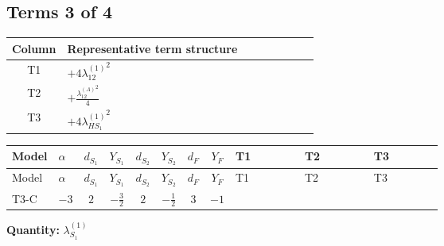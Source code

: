 \documentclass[8pt]{article}
\begin{document}
\begin{landscape}
\subsection*{Terms 3 of 4}
\begin{center}
\begin{tabular}{@{}c >{\raggedright\arraybackslash}p{0.82\linewidth}@{}}
\toprule
Column & Representative term structure \\
\midrule
T1 & \(\displaystyle +4 {\lambda_{12}^{(1)}}^2\) \\
\midrule
T2 & \(\displaystyle +\frac{{\lambda_{12}^{(A)}}^2}{4}\) \\
\midrule
T3 & \(\displaystyle +4 {\lambda_{HS_1}^{(1)}}^2\) \\
\midrule
\bottomrule
\end{tabular}
\end{center}
\smallskip
\tiny
\begin{longtable}{@{}llcccccc >{\raggedright\arraybackslash}p{0.21\linewidth} >{\raggedright\arraybackslash}p{0.21\linewidth} >{\raggedright\arraybackslash}p{0.21\linewidth}@{}}
\toprule
Model & $\alpha$ & $d_{S_1}$ & $Y_{S_1}$ & $d_{S_2}$ & $Y_{S_2}$ & $d_F$ & $Y_F$ & T1 & T2 & T3 \\
\midrule
\endfirsthead
\toprule
Model & $\alpha$ & $d_{S_1}$ & $Y_{S_1}$ & $d_{S_2}$ & $Y_{S_2}$ & $d_F$ & $Y_F$ & T1 & T2 & T3 \\
\midrule
\endhead
T3-C & $-3$ & $2$ & $-\frac{3}{2}$ & $2$ & $-\frac{1}{2}$ & $3$ & $-1$ & \scriptsize\adjustbox{max width=\linewidth}{$\begin{gathered} +4 {\lambda_{12}^{(1)}}^2\end{gathered}$} & \scriptsize\adjustbox{max width=\linewidth}{$\begin{gathered} +\frac{{\lambda_{12}^{(A)}}^2}{4}\end{gathered}$} & \scriptsize\adjustbox{max width=\linewidth}{$\begin{gathered} +4 {\lambda_{HS_1}^{(1)}}^2\end{gathered}$} \\
\midrule
\bottomrule
\end{longtable}
\clearpage
\noindent\textbf{Quantity: }$\lambda_{S_1}^{(1)}$\par\smallskip

\end{landscape}
\end{document}
